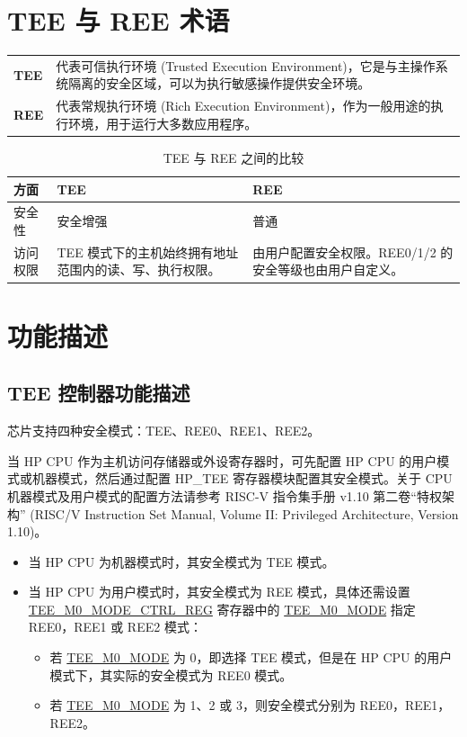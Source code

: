 \documentclass[main\_\_CN.tex]{subfiles}
\begin{document}
\section{TEE 与 REE 术语}

\begin{longtable}[L]{ R{2cm} p{13cm} }

\textbf{TEE} & 代表可信执行环境 (Trusted Execution Environment)，它是与主操作系统隔离的安全区域，可以为执行敏感操作提供安全环境。\\

\textbf{REE} & 代表常规执行环境 (Rich Execution Environment)，作为一般用途的执行环境，用于运行大多数应用程序。
\end{longtable}

\begin{longtable}{|L{3cm}|L{6cm}|L{6cm}|}
    \caption{TEE 与 REE 之间的比较}
    \label{tab:tee-ree-comparison}\\
\hline{}
\textbf{方面} & \textbf{TEE} & \textbf{REE} \\
\hline
安全性 & 安全增强 & 普通 \\
\hline
访问权限 & TEE 模式下的主机始终拥有地址范围内的读、写、执行权限。 & 由用户配置安全权限。REE0/1/2 的安全等级也由用户自定义。\\
\hline
\end{longtable}

\section{功能描述}

\subsection{TEE 控制器功能描述}

\chipname{} 芯片支持四种安全模式：TEE、REE0、REE1、REE2。

当 HP CPU 作为主机访问存储器或外设寄存器时，可先配置 HP CPU 的用户模式或机器模式，然后通过配置 HP\_TEE 寄存器模块配置其安全模式。关于 CPU 机器模式及用户模式的配置方法请参考 RISC-V 指令集手册 v1.10 第二卷“特权架构” (RISC\-/V Instruction Set Manual, Volume II: Privileged Architecture, Version 1.10)。
\begin{itemize}
    \item 当 HP CPU 为机器模式时，其安全模式为 TEE 模式。
    \item 当 HP CPU 为用户模式时，其安全模式为 REE 模式，具体还需设置 \hyperref[regdesc:TEEMNMODECTRLREG]{TEE\_M0\_MODE\_CTRL\_REG} 寄存器中的 \hyperref[fielddesc:TEEMNMODE]{TEE\_M0\_MODE} 指定 REE0，REE1 或 REE2 模式：
    \begin{itemize}
        \item 若 \hyperref[fielddesc:TEEMNMODE]{TEE\_M0\_MODE} 为 0，即选择 TEE 模式，但是在 HP CPU 的用户模式下，其实际的安全模式为 REE0 模式。
        \item 若 \hyperref[fielddesc:TEEMNMODE]{TEE\_M0\_MODE} 为 1、2 或 3，则安全模式分别为 REE0，REE1，REE2。
    \end{itemize}
\end{itemize}
\end{document}
